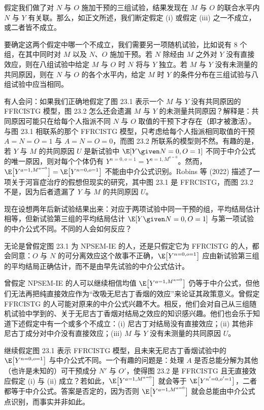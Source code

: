 \begin{finepoint}[可分离效应诸假定的经验否证]
\setlength{\parindent}{2em}
假定我们做了对 $N$ 与 $O$ 施加干预的三组试验，结果发现在 $M$ 与 $O$ 的联合水平内 $N$ 与 $Y$ 有关联。那么，如正文所述，我们断定假定 (i) 或假定 (iii) 之一不成立，或二者皆不成立。

要确定这两个假定中哪一个不成立，我们需要另一项随机试验，比如说有 8 个组，在其中同时对 $M$ 以及 $N$、$O$ 施加干预。若 $N$ 除经由 $M$ 之外对 $Y$ 没有直接效应，则在八组试验中给定 $M$ 与 $O$ 时 $N$ 将与 $Y$ 独立。若 $M$ 与 $Y$ 没有未测量的共同原因，则在 $N$ 与 $O$ 的各个水平内，给定 $M$ 时 $Y$ 的条件分布在三组试验与八组试验中应当相同。

有人会问：如果我们正确地假定了图 23.1 表示一个 $M$ 与 $Y$ 没有共同原因的 FFRCISTG 模型，图 23.2 怎么还会遗漏 $M$ 与 $Y$ 的未测量共同原因？解释是：共同原因可能只在给每个人指派不同 $N$ 与 $O$ 取值的干预下才存在（即才被激活）。与图 23.1 相联系的那个 FFRCISTG 模型，只考虑给每个人指派相同取值的干预 $A=N=O=1$ 与 $A=N=O=0$，而图 23.2 所联系的模型则不然。有趣的是，若 $Y$ 与 $M$ 的共同原因 $U$ 是新试验中 $\E[Y\given N=0,O=1]$ 不同于中介公式的唯一原因，则对每个个体仍有 $Y^{n=0,o=1}=Y^{a=1,M^{a=0}}$。然而，$\E\big[Y^{a=1,M^{a=0}}\big]=\E\big[Y^{n=0,o=1}\big]$ 不能由中介公式识别。Robins 等 (2022) 描述了一项关于河盲症治疗的假想但现实的研究，其中图 23.1 是 FFRCISTG，而图 23.2 不是，因为后者遗漏了 $Y$ 与 $M$ 的共同原因 $U$。
\end{finepoint}

现在设想两年后新试验结果出来：对应于两项试验中同一干预的组，平均结局估计相等，但新试验第三组的平均结局估计 $\E[Y\given N=0,O=1]$ 与第一项试验的中介公式不同。不同的人会如何反应？

无论是曾假定图 23.1 为 NPSEM-IE 的人，还是只假定它为 FFRCISTG 的人，都会同意：$O$ 与 $N$ 的可分离效应这个故事不正确，$\E\big[Y^{n=0,o=1}\big]$ 应由新试验第三组的平均结局正确估计，而不是由早先试验的中介公式估计。

曾假定 NPSEM-IE 的人可以继续相信均值 $\E\big[Y^{a=1,M^{a=0}}\big]$ 仍等于中介公式，但他们无法再把纯直接效应作为“改吸无尼古丁香烟的效应”来论证其政策意义。曾假定 FFRCISTG 的人可能对原来的中介公式兴趣不大。相反，他们会对自己从三组随机试验中学到的、关于无尼古丁香烟对结局之效应的知识感兴趣。他们也会乐于知道下述假定中有一个或多个不成立：(i) 尼古丁对结局没有直接效应；(ii) 其他非尼古丁成分对中介没有直接效应；(iii) $M$ 与 $Y$ 没有未测量的共同原因 $U$。

继续假定图 23.1 表示 FFRCISTG 模型，且未来无尼古丁香烟试验中的 $\E\big[Y^{n=0,o=1}\big]$ 与中介公式不同。一个有趣的问题是：\mnote{\textcolor{black!85}{若 $\E\big[Y^{a=1,M^{a=0}}\big]$ 总能由中介公式点识别，Robins 与 Richardson (2010) 的锐界就会被违反。}}处理 $A$ 是否总能分解为其他（也许是未知的）可干预成分 $N'$ 与 $O'$，使得图 23.2 是 FFRCISTG 且无直接效应假定 (i) 与 (ii) 成立？若如此，$\E\big[Y^{a=1,M^{a=0}}\big]$ 就会等于 $\E\big[Y^{n'=0,o'=1}\big]$，二者都等于中介公式。答案是否定的，因为否则 $\E\big[Y^{a=1,M^{a=0}}\big]$ 就会总能由中介公式点识别，而事实并非如此。

